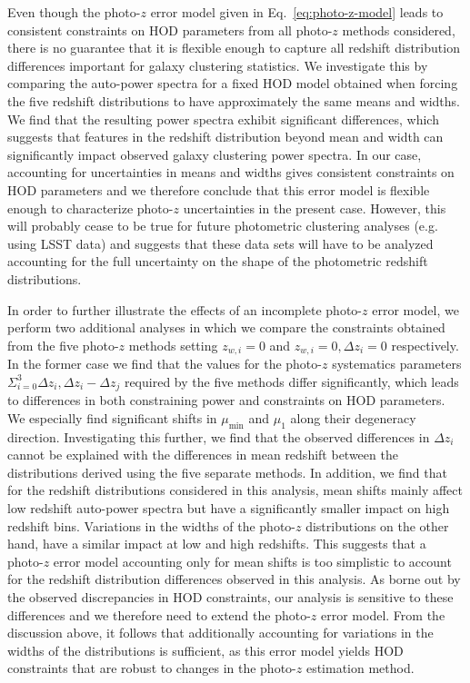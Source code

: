 \documentclass[a4paper,11pt]{article}
\begin{document}
      Even though the photo-$z$ error model given in Eq.~\ref{eq:photo-z-model} leads to consistent constraints on HOD parameters from all photo-$z$ methods considered, there is no guarantee that it is flexible enough to capture all redshift distribution differences important for galaxy clustering statistics. We investigate this by comparing the auto-power spectra for a fixed HOD model obtained when forcing the five redshift distributions to have approximately the same means and widths. We find that the resulting power spectra exhibit significant differences, which suggests that features in the redshift distribution beyond mean and width can significantly impact observed galaxy clustering power spectra. In our case, accounting for uncertainties in means and widths gives consistent constraints on HOD parameters and we therefore conclude that this error model is flexible enough to characterize photo-$z$ uncertainties in the present case. However, this will probably cease to be true for future photometric clustering analyses (e.g. using LSST data) and suggests that these data sets will have to be analyzed accounting for the full uncertainty on the shape of the photometric redshift distributions.

      In order to further illustrate the effects of an incomplete photo-$z$ error model, we perform two additional analyses in which we compare the constraints obtained from the five photo-$z$ methods setting $z_{w, i} = 0$ and $z_{w, i} = 0, \Delta z_{i} = 0$ respectively. In the former case we find that the values for the photo-$z$ systematics parameters $\Sigma_{i=0}^{3} \Delta z_{i}, \Delta z_{i} - \Delta z_{j}$ required by the five methods differ significantly, which leads to differences in both constraining power and constraints on HOD parameters. We especially find significant shifts in $\mu_{\mathrm{min}}$ and $\mu_{1}$ along their degeneracy direction. Investigating this further, we find that the observed differences in $\Delta z_{i}$ cannot be explained with the differences in mean redshift between the distributions derived using the five separate methods. In addition, we find that for the redshift distributions considered in this analysis, mean shifts mainly affect low redshift auto-power spectra but have a significantly smaller impact on high redshift bins. Variations in the widths of the photo-$z$ distributions on the other hand, have a similar impact at low and high redshifts. This suggests that a photo-$z$ error model accounting only for mean shifts is too simplistic to account for the redshift distribution differences observed in this analysis. As borne out by the observed discrepancies in HOD constraints, our analysis is sensitive to these differences and we therefore need to extend the photo-$z$ error model. From the discussion above, it follows that additionally accounting for variations in the widths of the distributions is sufficient, as this error model yields HOD constraints that are robust to changes in the photo-$z$ estimation method.
\end{document}
